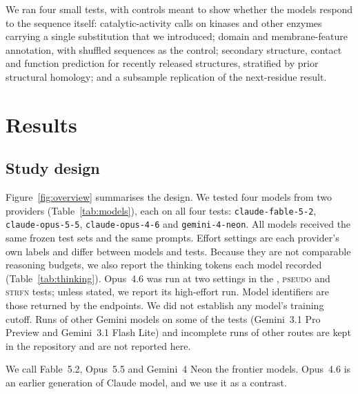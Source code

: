 \documentclass[11pt]{article}
\newcommand{\tpseudo}{\textmd{\textsc{pseudo}}}\newcommand{\tstrfn}{\textmd{\textsc{strfn}}}
\begin{document}
We ran four small tests, with controls meant to show whether the models respond to the sequence itself:
catalytic-activity calls on kinases and other enzymes carrying a single
substitution that we introduced; domain and membrane-feature annotation, with shuffled
sequences as the control; secondary structure, contact and function prediction for recently
released structures, stratified by prior structural homology; and a subsample replication of the
next-residue result.

\section{Results}

\subsection{Study design}

Figure~\ref{fig:overview} summarises the design. We tested four models from two providers (Table~\ref{tab:models}), each on all four tests:
\texttt{claude-fable-5-2}, \texttt{claude-opus-5-5}, \texttt{claude-opus-4-6} and
\texttt{gemini-4-neon}. All models received the same frozen test sets and the same
prompts. Effort settings are each provider's own labels and differ between models and tests. Because
they are not comparable reasoning budgets, we also report the thinking tokens each model recorded
(Table~\ref{tab:thinking}). Opus~4.6 was run at two settings in the \tfeat, \tpseudo{} and \tstrfn{} tests; unless stated, we report its
high-effort run. Model identifiers are those returned by the endpoints. We did not establish any model's
training cutoff. Runs of other Gemini models on some of the tests (Gemini~3.1 Pro Preview and Gemini~3.1 Flash Lite)
and incomplete runs of other routes are kept in the repository and are not reported here.

We call Fable~5.2, Opus~5.5 and Gemini~4 Neon the frontier models. Opus~4.6 is an earlier generation of
Claude model, and we use it as a contrast.
\end{document}
